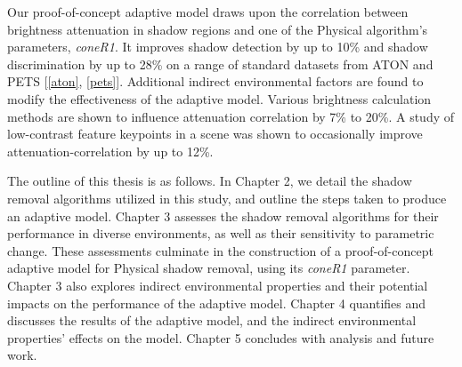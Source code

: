 Our proof-of-concept adaptive model draws upon the correlation between brightness attenuation in shadow regions and one of the Physical algorithm's parameters, \textit{coneR1}. It improves shadow detection by up to 10\% and shadow discrimination by up to 28\% on a range of standard datasets from ATON and PETS [\ref{aton}, \ref{pets}]. Additional indirect environmental factors are found to modify the effectiveness of the adaptive model. Various brightness calculation methods are shown to influence attenuation correlation by 7\% to 20\%.
A study of low-contrast feature keypoints in a scene was shown to occasionally improve attenuation-correlation by up to 12\%.

The outline of this thesis is as follows. In Chapter 2, we detail the shadow removal algorithms utilized in this study, and outline the steps taken to produce an adaptive model. Chapter 3 assesses the shadow removal algorithms for their performance in diverse environments, as well as their sensitivity to parametric change. These assessments culminate in the construction of a proof-of-concept adaptive model for Physical shadow removal, using its \textit{coneR1} parameter. Chapter 3 also explores indirect environmental properties and their potential impacts on the performance of the adaptive model. Chapter 4 quantifies and discusses the results of the adaptive model, and the indirect environmental properties' effects on the model. Chapter 5 concludes with analysis and future work. 


